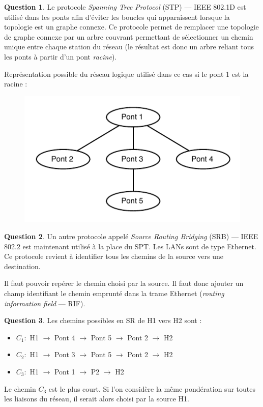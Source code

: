 \documentclass[11pt,english,french]{scrreprt}
\theoremstyle{remark}
\theoremstyle{definition}
\newtheorem{ques}{Question}[section]
\begin{document}
\begin{ques}
	Le protocole \emph{Spanning Tree Protocol} (STP) --- IEEE 802.1D est utilisé dans les ponts afin d'éviter les boucles qui apparaissent lorsque la topologie est un graphe connexe. Ce protocole permet de remplacer une topologie de graphe connexe par un arbre couvrant permettant de sélectionner un chemin unique entre chaque station du réseau (le résultat est donc un arbre reliant tous les ponts à partir d'un pont \emph{racine}).
	
	Représentation possible du réseau logique utilisé dans ce cas si le pont 1 est la racine :
	\begin{figure}[h]
		\center
		\includegraphics[scale=1]{Exam2009/STP}
	\end{figure}
\end{ques}

\begin{ques}
	Un autre protocole appelé \emph{Source Routing Bridging} (SRB) --- IEEE 802.2 est maintenant utilisé à la place du SPT. Les LANs sont de type Ethernet. Ce protocole revient à identifier tous les chemins de la source vers une destination.
	
	Il faut pouvoir repérer le chemin choisi par la source. Il faut donc ajouter un champ identifiant le chemin emprunté dans la trame Ethernet (\emph{routing information field} --- RIF).
\end{ques}

\begin{ques}
	Les chemins possibles en SR de H1 vers H2 sont :\begin{itemize}
		\item $C_1\colon$ H1 $\rightarrow$ Pont 4 $\rightarrow$ Pont 5 $\rightarrow$ Pont 2 $\rightarrow$ H2
		\item $C_2\colon$ H1 $\rightarrow$ Pont 3 $\rightarrow$ Pont 5 $\rightarrow$ Pont 2 $\rightarrow$ H2
		\item $C_3\colon$ H1 $\rightarrow$ Pont 1 $\rightarrow$ P2 $\rightarrow$ H2
	\end{itemize}
	
	Le chemin $C_3$ est le plus court. Si l'on considère la même pondération sur toutes les liaisons du réseau, il serait alors choisi par la source H1.
\end{ques}
\end{document}
